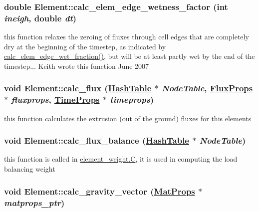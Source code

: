 \hypertarget{classElement_a131}{
\subsubsection[calc\_\-elem\_\-edge\_\-wetness\_\-factor]{\setlength{\rightskip}{0pt plus 5cm}double Element::calc\_\-elem\_\-edge\_\-wetness\_\-factor (int {\em ineigh}, double {\em dt})}}
\label{classElement_a131}


this function relaxes the zeroing of fluxes through cell edges that are completely dry at the beginning of the timestep, as indicated by \hyperlink{classElement_a130}{calc\_\-elem\_\-edge\_\-wet\_\-fraction()}, but will be at least partly wet by the end of the timestep... Keith wrote this function June 2007 

\hypertarget{classElement_a110}{
\subsubsection[calc\_\-flux]{\setlength{\rightskip}{0pt plus 5cm}void Element::calc\_\-flux (\hyperlink{classHashTable}{Hash\-Table} $\ast$ {\em Node\-Table}, \hyperlink{structFluxProps}{Flux\-Props} $\ast$ {\em fluxprops}, \hyperlink{structTimeProps}{Time\-Props} $\ast$ {\em timeprops})}}
\label{classElement_a110}


this function calculates the extrusion (out of the ground) fluxes for this elements 

\hypertarget{classElement_a94}{
\subsubsection[calc\_\-flux\_\-balance]{\setlength{\rightskip}{0pt plus 5cm}void Element::calc\_\-flux\_\-balance (\hyperlink{classHashTable}{Hash\-Table} $\ast$ {\em Node\-Table})}}
\label{classElement_a94}


this function is called in \hyperlink{constant_8h_a21}{element\_\-weight.C}, it is used in computing the load balancing weight 

\hypertarget{classElement_a97}{
\subsubsection[calc\_\-gravity\_\-vector]{\setlength{\rightskip}{0pt plus 5cm}void Element::calc\_\-gravity\_\-vector (\hyperlink{structMatProps}{Mat\-Props} $\ast$ {\em matprops\_\-ptr})}}
\label{classElement_a97}


